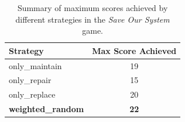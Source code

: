 \documentclass[12pt,a4paper]{article}
\begin{document}
        \begin{table}
            \centering
            \begin{tabular}{lc}
                \toprule
                \textbf{Strategy} & \textbf{Max Score Achieved} \\
                \midrule
                only\_maintain & 19 \\
                only\_repair & 15 \\
                only\_replace & 20 \\
                \textbf{weighted\_random} & \textbf{22} \\
                \bottomrule
            \end{tabular}
            \caption{Summary of maximum scores achieved by different strategies in the \textit{Save Our System} game.}
            \label{tab:strategy-comparison}
        \end{table}
\end{document}
